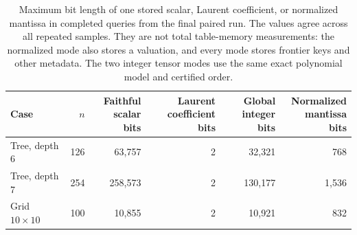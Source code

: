 \begin{table}[H]
\centering\footnotesize
\setlength{\tabcolsep}{3pt}
\renewcommand{\arraystretch}{1.12}
\begin{tabular*}{\linewidth}{@{\extracolsep{\fill}}lrrrrr@{}}
\toprule
Case & $n$ & \shortstack{Faithful\\scalar bits} & \shortstack{Laurent\\coefficient bits} & \shortstack{Global\\integer bits} & \shortstack{Normalized\\mantissa bits}\\
\midrule
Tree, depth 6 & 126 & 63,757 & 2 & 32,321 & 768\\
Tree, depth 7 & 254 & 258,573 & 2 & 130,177 & 1,536\\
Grid $10\times10$ & 100 & 10,855 & 2 & 10,921 & 832\\
\bottomrule
\end{tabular*}
\caption{Maximum bit length of one stored scalar, Laurent coefficient, or normalized mantissa in completed queries from the final paired run. The values agree across all repeated samples. They are not total table-memory measurements: the normalized mode also stores a valuation, and every mode stores frontier keys and other metadata. The two integer tensor modes use the same exact polynomial model and certified order.}
\label{tab:tensor-precision}
\end{table}
